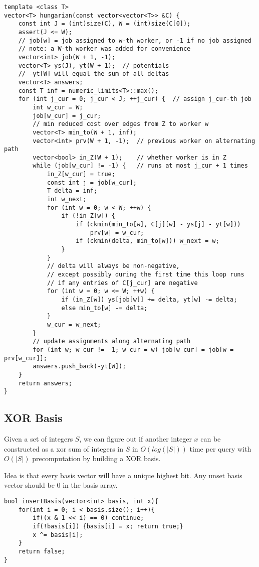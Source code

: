 \documentclass[8pt, headheight=10pt, a4paper]{article}
\begin{document}
\begin{multicols*}{3}
\begin{lstlisting}
template <class T>
vector<T> hungarian(const vector<vector<T>> &C) {
    const int J = (int)size(C), W = (int)size(C[0]);
    assert(J <= W);
    // job[w] = job assigned to w-th worker, or -1 if no job assigned
    // note: a W-th worker was added for convenience
    vector<int> job(W + 1, -1);
    vector<T> ys(J), yt(W + 1);  // potentials
    // -yt[W] will equal the sum of all deltas
    vector<T> answers;
    const T inf = numeric_limits<T>::max();
    for (int j_cur = 0; j_cur < J; ++j_cur) {  // assign j_cur-th job
        int w_cur = W;
        job[w_cur] = j_cur;
        // min reduced cost over edges from Z to worker w
        vector<T> min_to(W + 1, inf);
        vector<int> prv(W + 1, -1);  // previous worker on alternating path
        vector<bool> in_Z(W + 1);    // whether worker is in Z
        while (job[w_cur] != -1) {   // runs at most j_cur + 1 times
            in_Z[w_cur] = true;
            const int j = job[w_cur];
            T delta = inf;
            int w_next;
            for (int w = 0; w < W; ++w) {
                if (!in_Z[w]) {
                    if (ckmin(min_to[w], C[j][w] - ys[j] - yt[w]))
                        prv[w] = w_cur;
                    if (ckmin(delta, min_to[w])) w_next = w;
                }
            }
            // delta will always be non-negative,
            // except possibly during the first time this loop runs
            // if any entries of C[j_cur] are negative
            for (int w = 0; w <= W; ++w) {
                if (in_Z[w]) ys[job[w]] += delta, yt[w] -= delta;
                else min_to[w] -= delta;
            }
            w_cur = w_next;
        }
        // update assignments along alternating path
        for (int w; w_cur != -1; w_cur = w) job[w_cur] = job[w = prv[w_cur]];
        answers.push_back(-yt[W]);
    }
    return answers;
}

\end{lstlisting}

\subsection{XOR Basis}
Given a set of integers $S$, we can figure out if another integer $x$ can be constructed as a xor sum of integers in $S$ in $O(log(|S|))$ time per query with $O(|S|)$ precomputation by building a XOR basis. 

Idea is that every basis vector will have a unique highest bit. Any unset basis vector should be 0 in the basis array. 
\begin{lstlisting}
bool insertBasis(vector<int> basis, int x){
    for(int i = 0; i < basis.size(); i++){
        if((x & 1 << i) == 0) continue;
        if(!basis[i]) {basis[i] = x; return true;}
        x ^= basis[i];
    }
    return false;
}


\end{lstlisting}
\end{multicols*}
\end{document}
